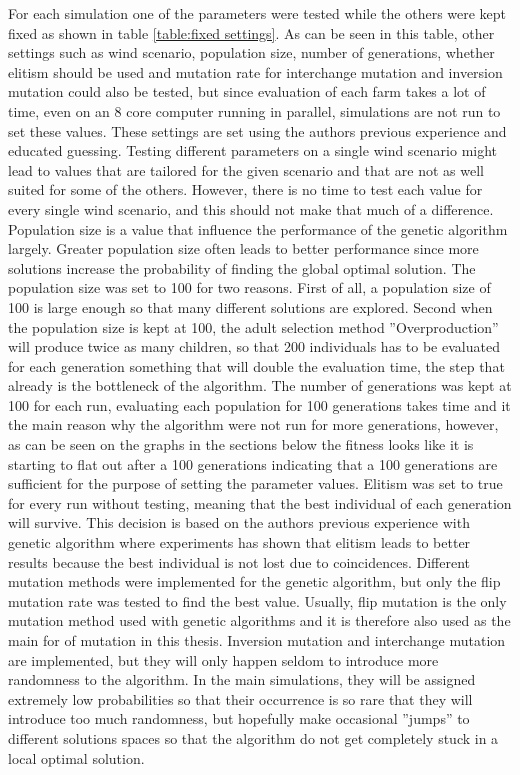 \documentclass[12pt]{report}
\begin{document}
\noindent For each simulation one of the parameters were tested while the others were kept fixed as shown in table \ref{table:fixed settings}. As can be seen in this table, other settings such as wind scenario, population size, number of generations, whether elitism should be used and mutation rate for interchange mutation and inversion mutation could also be tested, but since evaluation of each farm takes a lot of time, even on an 8 core computer running in parallel, simulations are not run to set these values. These settings are set using the authors previous experience and educated guessing. Testing different parameters on a single wind scenario might lead to values that are tailored for the given scenario and that are not as well suited for some of the others. However, there is no time to test each value for every single wind scenario, and this should not make that much of a difference. Population size is a value that influence the performance of the genetic algorithm largely. Greater population size often leads to better performance since more solutions increase the probability of finding the global optimal solution. The population size was set to 100 for two reasons. First of all, a population size of 100 is large enough so that many different solutions are explored. Second when the population size is kept at 100, the adult selection method ''Overproduction'' will produce twice as many children, so that 200 individuals has to be evaluated for each generation something that will double the evaluation time, the step that already is the bottleneck of the algorithm. The number of generations was kept at 100 for each run, evaluating each population for 100 generations takes time and it the main reason why the algorithm were not run for more generations, however, as can be seen on the graphs in the sections below the fitness looks like it is starting to flat out after a 100 generations indicating that a 100 generations are sufficient for the purpose of setting the parameter values. Elitism was set to true for every run without testing, meaning that the best individual of each generation will survive. This decision is based on the authors previous experience with genetic algorithm where experiments has shown that elitism leads to better results because the best individual is not lost due to coincidences. Different mutation methods were implemented for the genetic algorithm, but only the flip mutation rate was tested to find the best value. Usually, flip mutation is the only mutation method used with genetic algorithms and it is therefore also used as the main for of mutation in this thesis. Inversion mutation and interchange mutation are implemented, but they will only happen seldom to introduce more randomness to the algorithm. In the main simulations, they will be assigned extremely low probabilities so that their occurrence is so rare that they will introduce too much randomness, but hopefully make occasional ''jumps'' to different solutions spaces so that the algorithm do not get completely stuck in a local optimal solution. 
\end{document}
